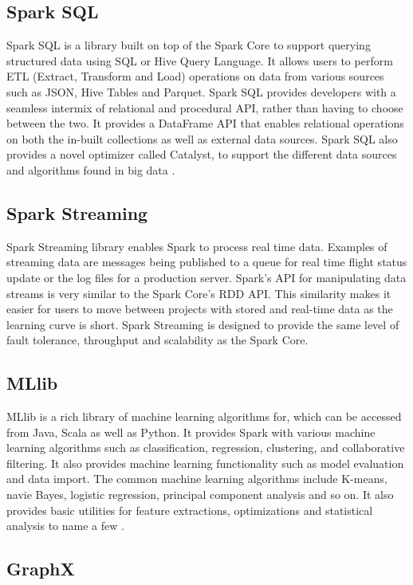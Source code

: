 \documentclass[9pt,twocolumn,twoside]{../../styles/osajnl}
\begin{document}
\subsection{Spark SQL}
Spark SQL \cite{book-spark} is a library built on top of the Spark
Core to support querying structured data using SQL or Hive Query
Language. It allows users to perform ETL (Extract, Transform and Load)
operations on data from various sources such as JSON, Hive Tables and
Parquet. Spark SQL provides developers with a seamless intermix of
relational and procedural API, rather than having to choose between
the two.  It provides a DataFrame API that enables relational
operations on both the in-built collections as well as external data
sources. Spark SQL also provides a novel optimizer called Catalyst, to
support the different data sources and algorithms found in big data
\cite{paper-sparksql}.

\subsection{Spark Streaming}
Spark Streaming \cite{book-spark} library enables Spark to process
real time data. Examples of streaming data are messages being
published to a queue for real time flight status update or the log
files for a production server. Spark's API for manipulating data
streams is very similar to the Spark Core’s RDD API. This similarity
makes it easier for users to move between projects with stored and
real-time data as the learning curve is short.  Spark Streaming is
designed to provide the same level of fault tolerance, throughput and
scalability as the Spark Core.

\subsection{MLlib}
MLlib \cite{book-spark} is a rich library of machine learning
algorithms for, which can be accessed from Java, Scala as well as
Python. It provides Spark with various machine learning algorithms
such as classification, regression, clustering, and collaborative
filtering. It also provides machine learning functionality such as
model evaluation and data import. The common machine learning
algorithms include K-means, navie Bayes, logistic regression,
principal component analysis and so on. It also provides basic
utilities for feature extractions, optimizations and statistical
analysis to name a few \cite{article-mllib}.

\subsection{GraphX}
\end{document}
